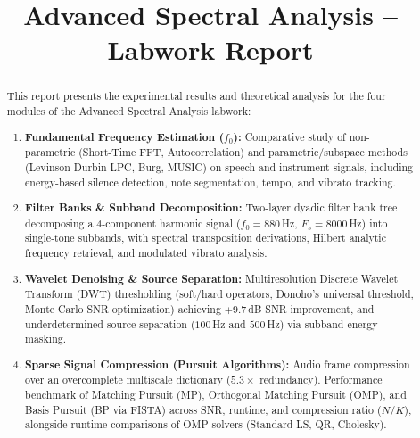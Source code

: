 \documentclass{rapportCS}
\title{Advanced Spectral Analysis -- Labwork Report}
\begin{document}




\tuteurecole{~}



\fairemarges
\fairepagedegarde

\begin{center}
	\begin{abstract}
        This report presents the experimental results and theoretical analysis for the four modules of the Advanced Spectral Analysis labwork:
        \begin{enumerate}
            \item \textbf{Fundamental Frequency Estimation ($f_0$):} Comparative study of non-parametric (Short-Time FFT, Autocorrelation) and parametric/subspace methods (Levinson-Durbin LPC, Burg, MUSIC) on speech and instrument signals, including energy-based silence detection, note segmentation, tempo, and vibrato tracking.
            \item \textbf{Filter Banks \& Subband Decomposition:} Two-layer dyadic filter bank tree decomposing a 4-component harmonic signal ($f_0=880$\,Hz, $F_s=8000$\,Hz) into single-tone subbands, with spectral transposition derivations, Hilbert analytic frequency retrieval, and modulated vibrato analysis.
            \item \textbf{Wavelet Denoising \& Source Separation:} Multiresolution Discrete Wavelet Transform (DWT) thresholding (soft/hard operators, Donoho's universal threshold, Monte Carlo SNR optimization) achieving $+9.7$\,dB SNR improvement, and underdetermined source separation ($100$\,Hz and $500$\,Hz) via subband energy masking.
            \item \textbf{Sparse Signal Compression (Pursuit Algorithms):} Audio frame compression over an overcomplete multiscale dictionary ($5.3\times$ redundancy). Performance benchmark of Matching Pursuit (MP), Orthogonal Matching Pursuit (OMP), and Basis Pursuit (BP via FISTA) across SNR, runtime, and compression ratio ($N/K$), alongside runtime comparisons of OMP solvers (Standard LS, QR, Cholesky).
        \end{enumerate}
    \end{abstract}
\end{center}
\newpage
\end{document}
